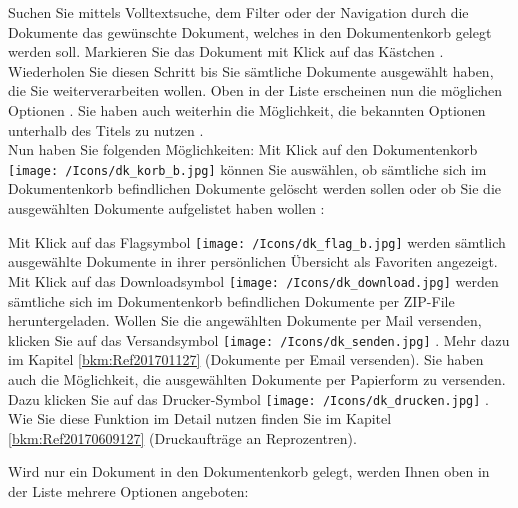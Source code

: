 Suchen Sie mittels Volltextsuche, dem Filter oder der Navigation durch die Dokumente das gewünschte Dokument, welches in den Dokumentenkorb gelegt werden soll. Markieren Sie das Dokument mit Klick auf das Kästchen . Wiederholen Sie diesen Schritt bis Sie sämtliche Dokumente ausgewählt haben, die Sie weiterverarbeiten wollen. Oben in der Liste erscheinen nun die möglichen Optionen . Sie haben auch weiterhin die Möglichkeit, die bekannten Optionen unterhalb des Titels zu nutzen . \\
Nun haben Sie folgenden Möglichkeiten: Mit Klick auf den Dokumentenkorb \texttt{[image: /Icons/dk\_korb\_b.jpg]}  können Sie auswählen, ob sämtliche sich im Dokumentenkorb befindlichen Dokumente gelöscht werden sollen  oder ob Sie die ausgewählten Dokumente aufgelistet haben wollen :
\begin{figure}[H]
\end{figure}

Mit Klick auf das Flagsymbol \texttt{[image: /Icons/dk\_flag\_b.jpg]}  werden sämtlich ausgewählte Dokumente in ihrer persönlichen Übersicht als Favoriten angezeigt. \\
Mit Klick auf das Downloadsymbol \texttt{[image: /Icons/dk\_download.jpg]}  werden sämtliche sich im Dokumentenkorb befindlichen Dokumente per ZIP-File heruntergeladen. Wollen Sie die angewählten Dokumente per Mail versenden, klicken Sie auf das Versandsymbol \texttt{[image: /Icons/dk\_senden.jpg]} . Mehr dazu im Kapitel \ref{bkm:Ref201701127} (Dokumente per Email versenden). Sie haben auch die Möglichkeit, die ausgewählten Dokumente per Papierform zu versenden. Dazu klicken Sie auf das Drucker-Symbol \texttt{[image: /Icons/dk\_drucken.jpg]} . Wie Sie diese Funktion im Detail nutzen finden Sie im Kapitel \ref{bkm:Ref20170609127} (Druckaufträge an Reprozentren).

\vspace{\baselineskip}

Wird nur ein Dokument in den Dokumentenkorb gelegt, werden Ihnen oben in der Liste mehrere Optionen angeboten:

